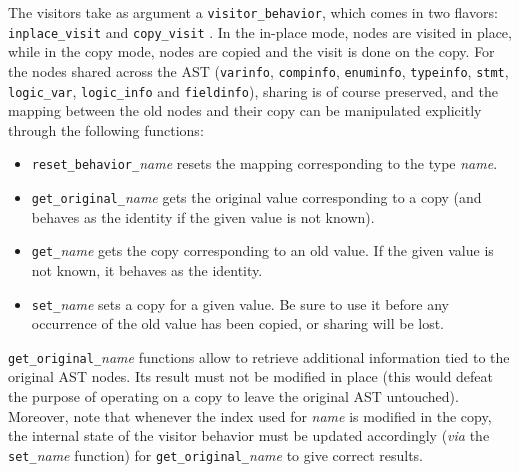 The visitors take as argument a
\verb+visitor_behavior+, which comes in two
flavors: \verb+inplace_visit+%
 and \verb+copy_visit+%
. In the in-place mode,
nodes are visited in place, while in the copy mode, nodes are copied and the
visit is done on the copy. For the nodes
shared across the AST
(\verb+varinfo+,
\verb+compinfo+,
\verb+enuminfo+,
\verb+typeinfo+,
\verb+stmt+,
\verb+logic_var+,
\verb+logic_info+ and
\verb+fieldinfo+), sharing is of course
preserved, and the mapping between the old nodes and their copy can be
manipulated explicitly through the following functions:
\begin{itemize}
\item
  \verb+reset_behavior_+\emph{name}
  resets the mapping corresponding to the type \emph{name}.
\item \verb+get_original_+\emph{name}
  gets the original value corresponding to a copy (and behaves as the identity
  if the given value is not known).
\item \verb+get_+\emph{name} gets the copy
  corresponding to an old value. If the given value is not known, it behaves as
  the identity.
\item \verb+set_+\emph{name} sets a copy for a
  given value. Be sure to use it before any occurrence of the old value has
  been copied, or sharing will be lost.
\end{itemize}

\begin{important}
  \verb+get_original_+\emph{name} functions allow to retrieve additional
  information tied to the original AST nodes. Its result must not be modified
  in place (this would defeat the purpose of operating
  on a copy to leave the original AST untouched). Moreover, note that whenever
  the index used for \emph{name} is modified in the copy, the internal state of
  the visitor behavior must be updated accordingly
  (\emph{via} the \verb+set_+\emph{name} function) for
  \verb+get_original_+\emph{name} to give correct results.
\end{important}

